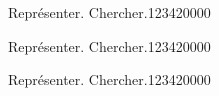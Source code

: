 \begin{pageParcoursd}

\begin{ExoCd}{Représenter. Chercher.}{1234}{2}{0}{0}{0}{0}
 
\end{ExoCd}

\begin{ExoCd}{Représenter. Chercher.}{1234}{2}{0}{0}{0}{0}
 
\end{ExoCd}

\begin{ExoCd}{Représenter. Chercher.}{1234}{2}{0}{0}{0}{0}
 
\end{ExoCd}


\end{pageParcoursd}



